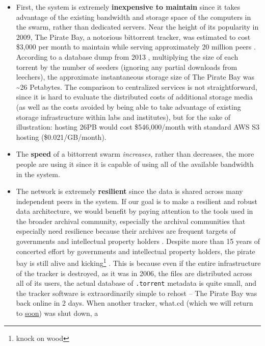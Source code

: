 \documentclass[10pt]{article}
\begin{document}
\begin{multicols}{2}
\begin{itemize}
\item
  First, the system is extremely \textbf{inexpensive to maintain} since
  it takes advantage of the existing bandwidth and storage space of the
  computers in the swarm, rather than dedicated servers. Near the height
  of its popularity in 2009, The Pirate Bay, a notorious bittorrent
  tracker, was estimated to cost \$3,000 per month to maintain while
  serving approximately 20 million peers \cite{roettgersPirateBayDistributing2009} . According to a database dump
  from 2013 \cite{PirateBayArchiveteam2020} , multiplying the
  size of each torrent by the number of seeders (ignoring any partial
  downloads from leechers), the approximate instantaneous storage size
  of The Pirate Bay was \textasciitilde26 Petabytes. The comparison to
  centralized services is not straightforward, since it is hard to
  evaluate the distributed costs of additional storage media (as well as
  the costs avoided by being able to take advantage of existing storage
  infrastructure within labs and institutes), but for the sake of
  illustration: hosting 26PB would cost \$546,000/month with standard
  AWS S3 hosting (\$0.021/GB/month).
\item
  The \textbf{speed} of a bittorrent swarm \emph{increases,} rather than
  decreases, the more people are using it since it is capable of using
  all of the available bandwidth in the system.
\item
  The network is extremely \textbf{resilient} since the data is shared
  across many independent peers in the system. If our goal is to make a
  resilient and robust data architecture, we would benefit by paying
  attention to the tools used in the broader archival community,
  especially the archival communities that especially need resilience
  because their archives are frequent targets of governments and
  intellectual property holders\cite{spiesDataIntegrityLibrarians2017} . Despite more than 15 years of
  concerted effort by governments and intellectual property holders, the
  pirate bay is still alive and kicking\footnote{knock on wood} \cite{kim15YearsPirate2019} . This is because even if the entire
  infrastructure of the tracker is destroyed, as it was in 2006, the
  files are distributed across all of its users, the actual database of
  \texttt{.torrent} metadata is quite small, and the tracker software is
  extraordinarily simple to rehost \cite{vandersarOpenBayNow2014}  -- The Pirate Bay was back online in 2 days. When another
  tracker, what.cd (which we will return to
  \protect\hyperlink{archives-need-communities}{soon}) was shut down, a

\end{itemize}
\end{multicols}
\end{document}
